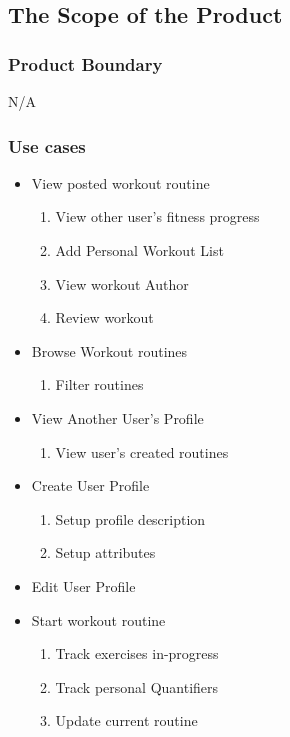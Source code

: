\documentclass[12pt]{article}
\begin{document}
\subsection{The Scope of the Product}
\subsubsection{Product Boundary}
N/A
\subsubsection{Use cases}

\begin{itemize}
	\item View posted workout routine 
	\begin{enumerate}
		\item View other user's fitness progress
		\item Add Personal Workout List
		\item View workout Author
		\item Review workout
	\end{enumerate}
	
	\item Browse Workout routines
	\begin{enumerate}
		\item Filter routines
	\end{enumerate}
	
	\item View Another User's Profile
	\begin{enumerate}
		\item View user's created routines
	\end{enumerate}
	
	\item Create User Profile
	\begin{enumerate}
		\item Setup profile description
		\item Setup attributes
	\end{enumerate}
	
	\item Edit User Profile
	
	\item Start workout routine
	\begin{enumerate}
		\item Track exercises in-progress
		\item Track personal Quantifiers
		\item Update current routine
	\end{enumerate}
	

\end{itemize}
\end{document}
